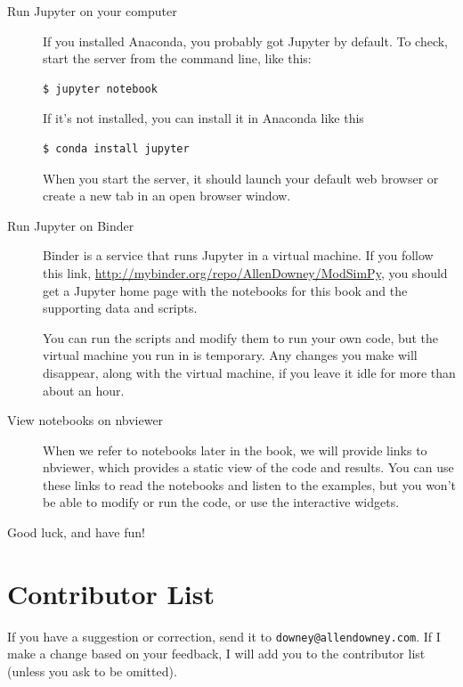 \documentclass[12pt]{book}
\theoremstyle{exercise}
\begin{document}
\begin{description}

\item[Run Jupyter on your computer]

If you installed Anaconda, you
  probably got Jupyter by default.  To check, start the server from
the command line, like this:

\begin{verbatim}
$ jupyter notebook
\end{verbatim}

If it's not installed, you can install it in Anaconda like this

\begin{verbatim}
$ conda install jupyter
\end{verbatim}

When you start the server, it should launch your default web browser
or create a new tab in an open browser window.

\item[Run Jupyter on Binder]

Binder is a service that runs Jupyter in a virtual machine.  If you
follow this link, \url{http://mybinder.org/repo/AllenDowney/ModSimPy},
you should get a Jupyter home page with the notebooks for this book
and the supporting data and scripts.

You can run the scripts and modify them to run your own code, but the
virtual machine you run in is temporary.  Any changes you make will
disappear, along with the virtual machine, if you leave it idle for
more than about an hour.

\item[View notebooks on nbviewer]

When we refer to notebooks later in the book, we will provide links to
nbviewer, which provides a static view of the code and results.  You
can use these links to read the notebooks and listen to the examples,
but you won't be able to modify or run the code, or use the
interactive widgets.

\end{description}

Good luck, and have fun!



\section*{Contributor List}

If you have a suggestion or correction, send it to 
{\tt downey@allendowney.com}.  If I make a change based on your
feedback, I will add you to the contributor list
(unless you ask to be omitted).
\end{document}
